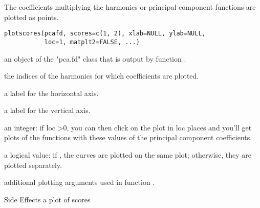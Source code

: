 \begin{Description}\relax
The coefficients multiplying the harmonics or principal component functions
are plotted as points.
\end{Description}
\begin{Usage}
\begin{verbatim}
plotscores(pcafd, scores=c(1, 2), xlab=NULL, ylab=NULL,
           loc=1, matplt2=FALSE, ...)
\end{verbatim}
\end{Usage}
\begin{Arguments}
\begin{ldescription}
\item[\code{pcafd}] an object of the "pca.fd" class that is output by function
.

\item[\code{scores}] the indices of the harmonics for which coefficients are
plotted.

\item[\code{xlab}] a label for the horizontal axis.

\item[\code{ylab}] a label for the vertical axis.

\item[\code{loc}] an integer:
if loc  >0, you can then click on the plot in loc places and you'll get
plots of the functions with these values of the principal component
coefficients.

\item[\code{matplt2}] a logical value:
if , the curves are plotted on the same plot;
otherwise, they are plotted separately.

\item[\code{... }] additional plotting arguments used in function .

\end{ldescription}
\end{Arguments}
\begin{Section}{Side Effects}
a plot of scores
\end{Section}
\begin{SeeAlso}\relax
{}
\end{SeeAlso}

